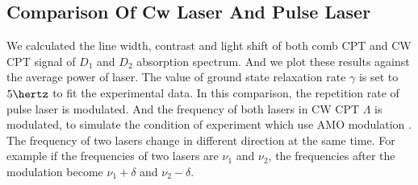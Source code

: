 \documentclass[11pt,a4paper]{article}
\begin{document}
\subsection{Comparison Of Cw Laser And Pulse Laser}
We calculated the line width, contrast and light shift of both comb CPT and CW CPT signal of $D_1$ and $D_2$ absorption spectrum. And we plot these results against the average power of laser. The value of ground state relaxation rate $\gamma$ is set to $5 \hertz$ to fit the experimental data. In this comparison, the repetition rate of pulse laser is modulated. And the frequency of both lasers in CW CPT $\Lambda$ is modulated, to simulate the condition of experiment which use AMO modulation . The frequency of two lasers change in different direction at the same time. For example if the frequencies of two lasers are $\nu_1$ and $\nu_2$, the frequencies after the modulation become $\nu_1+\delta$ and $\nu_2-\delta$.
\end{document}
